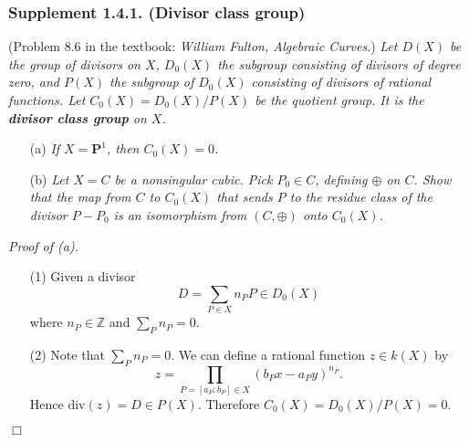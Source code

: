 \documentclass{article}
\begin{document}
\subsubsection*{Supplement 1.4.1. (Divisor class group)}
(Problem 8.6 in the textbook: \emph{William Fulton, Algebraic Curves}.)
\emph{Let $D(X)$ be the group of divisors on $X$,
$D_0(X)$ the subgroup consisting of divisors of degree zero,
and $P(X)$ the subgroup of $D_0(X)$ consisting of divisors of rational functions.
Let $C_0(X) = D_0(X)/P(X)$ be the quotient group.
It is the \textbf{divisor class group} on $X$.}
\begin{enumerate}
\item[(a)]
  \emph{If $X = \mathbf{P}^{1}$, then $C_0(X) = 0$.}

\item[(b)]
  \emph{Let $X = C$ be a nonsingular cubic.
  Pick $P_0 \in C$, defining $\oplus$ on $C$.
  Show that the map from $C$ to $C_0(X)$ that
  sends $P$ to the residue class of the divisor $P-P_0$
  is an isomorphism from $(C,\oplus)$ onto $C_0(X)$.} \\
\end{enumerate}



\emph{Proof of (a).}
\begin{enumerate}
\item[(1)]
  Given a divisor
  \[
    D = \sum_{P \in X} n_P P \in D_0(X)
  \]
  where $n_P \in \mathbb{Z}$ and $\sum_P n_P = 0$.

\item[(2)]
  Note that $\sum_P n_P = 0$.
  We can define a rational function $z \in k(X)$ by
  \[
    z
    = \prod_{P = [a_P:b_P] \in X} (b_P x - a_P y)^{n_P}.
  \]
  Hence $\mathrm{div}(z) = D \in P(X)$.
  Therefore $C_0(X) = D_0(X)/P(X) = 0$.
\end{enumerate}
$\Box$ \\
\end{document}
